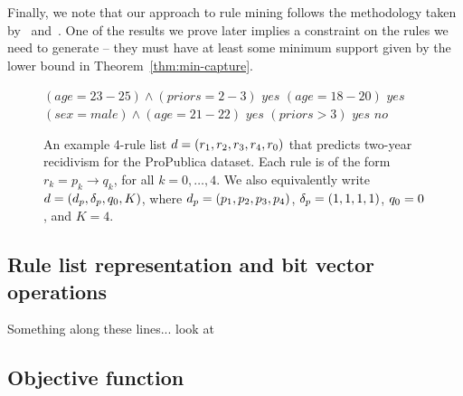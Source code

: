 Finally, we note that our approach to rule mining
follows the methodology taken by~\citet{LethamRuMcMa15} and~\citet{YangRuSe16}.
%
One of the results we prove later implies a constraint on the rules
we need to generate -- they must have at least some minimum support
given by the lower bound in Theorem~\ref{thm:min-capture}.

\begin{figure}[t!]
\begin{algorithmic}
\normalsize
\State \bif $(age=23-25) \wedge (priors=2-3)$ \bthen $yes$
\State \belif $(age=18-20)$ \bthen $yes$
\State \belif $(sex=male) \wedge (age=21-22)$ \bthen $yes$
\State \belif $(priors>3)$ \bthen $yes$
\State \belse $no$
\end{algorithmic}
\caption{An example 4-rule list ${{d} = (r_1, r_2, r_3, r_4, r_0)}$
that predicts two-year recidivism for the ProPublica dataset.
Each rule is of the form ${r_k = p_k \rightarrow q_k}$,
for all ${k = 0, \dots, 4}$.
We also equivalently write ${{d} = (d_p, \delta_p, q_0, K)}$,
where ${d_p = (p_1, p_2, p_3, p_4)}$, ${\delta_p = (1, 1, 1, 1)}$,
${q_0 = 0}$, and ${K=4}$.
}
\label{fig:rule-list}
\end{figure}


\begin{arxiv}
\subsection{Rule list representation and bit vector operations}
Something along these lines... look at~\citet{YangRuSe16}
\end{arxiv}

\subsection{Objective function}

